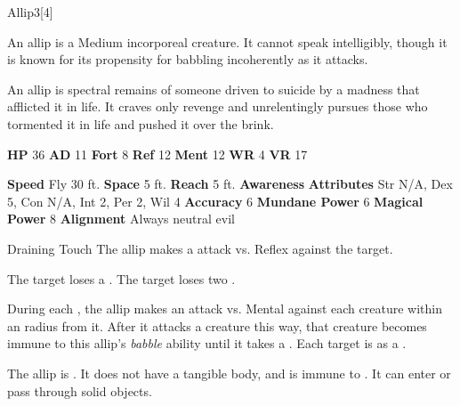       
  \begin{monsection}{Allip}{3}[4]
    \vspace{-1em}\vspace{-1em}
    \vspace{0em}

    
        An allip is a Medium incorporeal creature.
        It cannot speak intelligibly, though it is known for its propensity for babbling incoherently as it attacks.
      
        An allip is spectral remains of someone driven to suicide by a madness that afflicted it in life.
        It craves only revenge and unrelentingly pursues those who tormented it in life and pushed it over the brink.
      

    \begin{spellcontent}
      \begin{spelltargetinginfo}
        \pari \textbf{HP} 36 \monsep
          \textbf{AD} 11 \monsep
          \textbf{Fort} 8 \monsep
          \textbf{Ref} 12 \monsep
          \textbf{Ment} 12
        \pari \textbf{WR} 4 \monsep
        \textbf{VR} 17
        
      \end{spelltargetinginfo}
    \end{spellcontent}
    \begin{monsterfooter}
      \pari \textbf{Speed} Fly 30 ft. \monsep
        \textbf{Space} 5 ft. \monsep
        \textbf{Reach} 5 ft.
      \pari \textbf{Awareness} 
      \pari \textbf{Attributes}
        Str N/A, Dex 5,
        Con N/A, Int 2,
        Per 2, Wil 4
      \pari \textbf{Accuracy} 6 \monsep
        \textbf{Mundane Power} 6 \monsep
      \textbf{Magical Power} 8
      \pari \textbf{Alignment} Always neutral evil
    \end{monsterfooter}
  \end{monsection}
  \begin{freeability}{Draining Touch}
       The allip makes a  attack
        vs. Reflex against the target.
    
    \hit The target loses a .
    \crit The target loses two .
    \end{freeability}
  
      
          During each , the allip makes an attack vs. Mental against each creature
          within an \arealarge radius  from it.
          After it attacks a creature this way, that creature becomes immune to this allip's \textit{babble} ability until it takes a .
          \hit Each target is  as a .
        
      The allip is .
      It does not have a tangible body, and is immune to .
      It can enter or pass through solid objects.
  